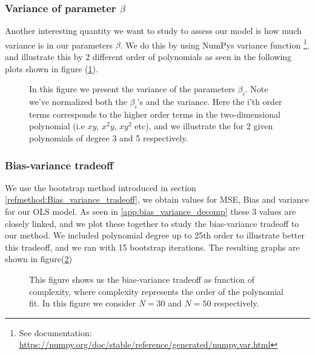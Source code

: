 \documentclass[../main.tex]{subfiles}
\begin{document}
\newpage
\subsubsection{Variance of parameter $\beta$}
Another interesting quantity we want to study to assess our model is how much variance is in our parameters $\beta$. We do this by using NumPys variance function \footnote{See documentation: \url{https://numpy.org/doc/stable/reference/generated/numpy.var.html}}, and illustrate this by 2 different order of polynomials as seen in the following plots shown in figure (\ref{fig: Variance_parameter_beta}). 
\begin{figure}[H]
\hspace*{-0.55in}

\caption{
In this figure we present the variance of the parameters $\beta_i$. Note we've normalized both the $\beta_i$'s and the variance. Here the i'th order terms corresponds to the higher order terms in the two-dimensional polynomial (i.e $xy$, $x^2y$, $xy^2$ etc), and we illustrate the for 2 given polynomials of degree 3 and 5 respectively.
}
\label{fig: Variance_parameter_beta}
\end{figure}
\newpage
\subsubsection{Bias-variance tradeoff}


We use the bootstrap method introduced in section \eqref{refmethod:Bias_variance_tradeoff}, we obtain values for MSE, Bias and variance for our OLS model. As seen in \eqref{app:bias_variance_decomp} these 3 values are closely linked, and we plot these together to study the bias-variance tradeoff to our method. We included polynomial degree up to 25th order to illustrate better this tradeoff, and we ran with 15 bootstrap iterations. The resulting graphs are shown in figure(\ref{fig: bias_variance_tradeoff_N30_N50}) 
\begin{figure}[H]
\hspace*{-0.5in}
\caption{This figure shows us the bias-variance tradeoff as function of complexity, where complexity represents the order of the polynomial fit. In this figure we consider $N = 30$ and $N=50$ respectively.}
\label{fig: bias_variance_tradeoff_N30_N50}
\end{figure}
\end{document}
